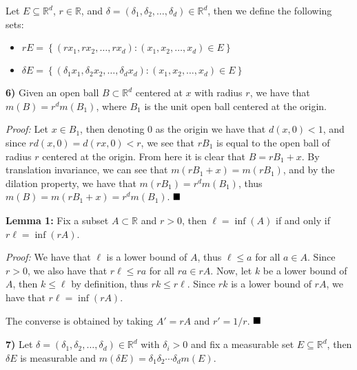 \documentclass[12pt]{article}
\newcommand{\R}{\mathbb{R}}
\renewcommand{\d}{\ensuremath{\delta}}
\newcommand{\braceb}[1]{\left\{#1\right\}}
\newcommand{\proof}{\textit{Proof: }}
\newcommand{\done}{\ensuremath{\strut\hfill\blacksquare}}
\begin{document}
\pagestyle{fancy}

\setlength{\parindent}{0in}
\setlength{\parskip}{0.1in}

Let \( E \subseteq \R^d \), \( r \in \R \), and
\( \d = (\d_1,\d_2,\dots,\d_d) \in \R^d \), then we define the following sets:

\begin{itemize}
	\item[]
		\(
			rE
			= \braceb{(rx_1,rx_2,\dots,rx_d) : (x_1,x_2,\dots,x_d) \in E}
		\)
	\item[]
		\(
			\d E
			= \braceb{
				(\d_1x_1,\d_2x_2,\dots,\d_dx_d)
				: (x_1,x_2,\dots,x_d) \in E
			}
		\)
\end{itemize}

\textbf{6)} Given an open ball \( B \subset \R^d \) centered at \( x \)
with radius \( r \), we have that \( m(B) = r^dm(B_1) \), where \( B_1 \) is
the unit open ball centered at the origin.

\proof
Let \( x \in B_1 \), then denoting \( 0 \) as the origin we have that
\( d(x,0) < 1 \), and since \( rd(x,0) = d(rx,0) < r \), we see that \( rB_1 \)
is equal to the open ball of radius \( r \) centered at the origin.
From here it is clear that \( B = rB_1 + x \).
By translation invariance, we can see that \( m(rB_1 + x) = m(rB_1) \), and by
the dilation property, we have that \( m(rB_1) = r^dm(B_1) \), thus
\( m(B) = m(rB_1 + x) = r^dm(B_1) \).
\done

\textbf{Lemma 1: } Fix a subset \( A \subset \R \) and \( r > 0 \), then
\( \ell = \inf(A) \) if and only if \( r\ell = \inf(rA) \).

\proof
We have that \( \ell \) is a lower bound of \( A \), thus
\( \ell \leq a \) for all \( a \in A \).
Since \( r > 0 \), we also have that \( r\ell \leq ra \) for all
\( ra \in rA \).
Now, let \( k \) be a lower bound of \( A \), then \( k \leq \ell \) by
definition, thus \( rk \leq r\ell \).
Since \( rk \) is a lower bound of \( rA \), we have that
\( r\ell = \inf(rA) \).

The converse is obtained by taking \( A' = rA \) and \( r' = 1/r \).
\done

\textbf{7)} Let \( \delta = (\delta_1, \delta_2, \dots, \delta_d) \in \R^d \)
with \( \delta_i > 0 \) and fix a measurable set \( E \subseteq \R^d \), then
\( \delta E \) is measurable and
\( m(\delta E) = \delta_1\delta_2 \cdots \delta_d m(E) \).
\end{document}
